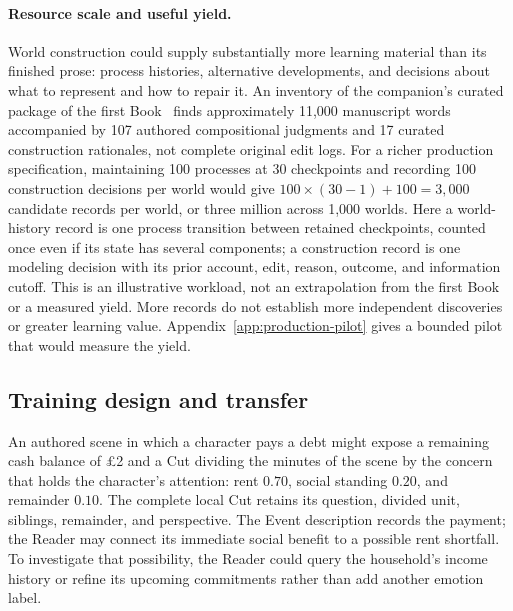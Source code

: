 \documentclass[10pt]{article}
\begin{document}
\paragraph{Resource scale and useful yield.}
World construction could supply substantially more learning material than its
finished prose: process histories, alternative developments, and decisions
about what to represent and how to repair it. An inventory of the companion's
curated package of the first Book~\cite{westerbergMeaning2026} finds approximately
11,000 manuscript words accompanied by 107 authored compositional judgments
and 17 curated construction rationales, not complete original edit logs.
For a richer production specification, maintaining 100 processes at 30
checkpoints and recording 100 construction decisions per world would give
$100\times(30-1)+100=3{,}000$ candidate records per world, or three million
across 1,000 worlds. Here a world-history record is one process transition
between retained checkpoints, counted once even if its state has several
components; a construction record is one modeling decision with its prior
account, edit, reason, outcome, and information cutoff. This is an illustrative
workload, not an extrapolation from the first Book or a measured yield. More records
do not establish more independent discoveries or greater learning value.
Appendix~\ref{app:production-pilot} gives a bounded pilot that would measure the yield.

\subsection{Training design and transfer}
\label{sec:training-design}

An authored scene in which a character pays a debt might expose
a remaining cash balance of \pounds2 and a Cut dividing the minutes of the scene by the
concern that holds the character's attention:
rent $0.70$, social standing $0.20$, and remainder $0.10$. The complete local
Cut retains its question, divided unit, siblings, remainder, and perspective. The Event
description records the payment; the Reader may connect its immediate social
benefit to a possible rent shortfall. To investigate that possibility, the
Reader could query the household's income history or refine its upcoming
commitments rather than add another emotion label.
\end{document}
